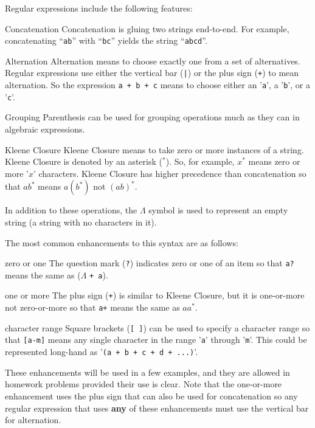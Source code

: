 \documentclass[letterpaper,12pt,openany,reqno]{book}%
\newcommand{\code}[1] {\lstinline[breaklines=yes,breakatwhitespace=yes]{#1}}
\newenvironment{mydesc}[1][9em]
  {
     \begin{basedescript}
     {
      \renewcommand{\makelabel}[1]{\bfseries##1}
      \desclabelwidth{ #1 }
      \desclabelstyle{\multilinelabel}
     }
  }
  {
     \end{basedescript}%
  }
\begin{document}
Regular expressions include the following features:
\begin{mydesc}[10em]
	\item[Concatenation] Concatenation is gluing two strings end-to-end. For example, concatenating ``\code{ab}'' with ``\code{bc}'' yields the string ``\code{abcd}''.
  \item[Alternation] Alternation means to choose exactly one from a set of alternatives. Regular expressions use either the vertical bar (\code{|}) or the plus sign (\code{+}) to mean alternation. So the expression \code{a + b + c} means to choose either an '\code{a}', a '\code{b}', or a '\code{c}'. 
	\item[Grouping] Parenthesis can be used for grouping operations much as they can in algebraic expressions.
	\item[Kleene Closure] Kleene Closure means to take zero or more instances of a string. Kleene Closure is denoted by an asterisk ($^*$). So, for example, $x^*$ means zero or more '$x$' characters. Kleene Closure has higher precedence than concatenation so that $ab^*$ means $a(b^*)$ not $(ab)^*$.
\end{mydesc}

In addition to these operations, the $\Lambda$ symbol is used to represent an empty string (a string with no characters in it).

The most common enhancements to this syntax are as follows:
\begin{mydesc}
\item[zero or one] The question mark
 (\code{?}) 
indicates zero or one of an item so that \code{a?} 
means the same as ($\Lambda$ \code{+ a}).
\item[one or more] The plus sign (\code{+}) is similar to Kleene Closure, but it is one-or-more not zero-or-more so that \code{a+} means the same as $aa^*$.
\item[character range] Square brackets (\code{[ ]}) can be used to specify a character range so that \code{[a-m]} means any single character in the range '\code{a}' through '\code{m}'. This could be represented long-hand as '\code{(a + b + c + d + ...)}'.
\end{mydesc}

These enhancements will be used in a few examples, and they are allowed in homework problems provided their use is clear. Note that the one-or-more enhancement uses the plus sign that can also be used for concatenation so any regular expression that uses \textbf{any} of these enhancements must use the vertical bar for alternation.
\end{document}
